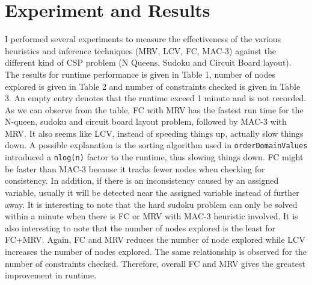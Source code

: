 \documentclass[9.5pt]{extarticle}
\begin{document}
\section{Experiment and Results}

I performed several experiments to measure the effectiveness of the various heuristics and inference techniques (MRV, LCV, FC, MAC-3) against the different kind of CSP problem (N Queens, Sudoku and Circuit Board layout). The results for runtime performance is given in Table 1, number of nodes explored is given in Table 2 and number of constraints checked is given in Table 3. An empty entry denotes that the runtime exceed 1 minute and is not recorded.\\

As we can observe from the table, FC with MRV has the fastest run time for the N-queen, sudoku and circuit board layout problem, followed by MAC-3 with MRV. It also seems like LCV, instead of speeding things up, actually slow things down. A possible explanation is the sorting algorithm used in \verb`orderDomainValues` introduced a \verb`nlog(n)` factor to the runtime, thus slowing things down. FC might be faster than MAC-3 because it tracks fewer nodes when checking for consistency. In addition, if there is an inconsistency caused by an assigned variable, usually it will be detected near the assigned variable instead of further away. It is interesting to note that the hard sudoku problem can only be solved within a minute when there is FC or MRV with MAC-3 heuristic involved. It is also interesting to note that the number of nodes explored is the least for FC+MRV. Again, FC and MRV reduces the number of node explored while LCV increases the number of nodes explored. The same relationship is observed for the number of constraints checked. Therefore, overall FC and MRV gives the greatest improvement in runtime.\\
\end{document}

